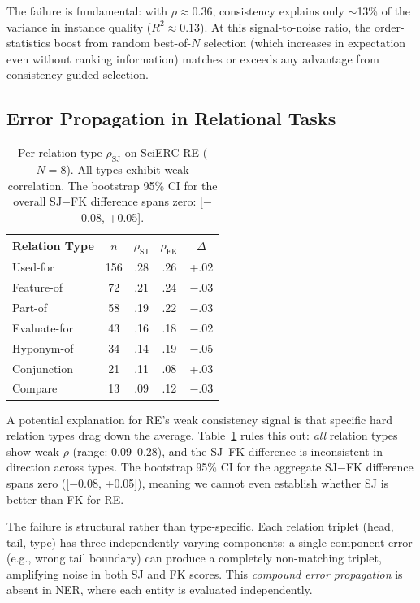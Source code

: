 \documentclass[11pt,a4paper]{article}
\begin{document}
The failure is fundamental: with $\rho \approx 0.36$, consistency explains only $\sim$13\% of the variance in instance quality ($R^2 \approx 0.13$).
At this signal-to-noise ratio, the order-statistics boost from random best-of-$N$ selection (which increases in expectation even without ranking information) matches or exceeds any advantage from consistency-guided selection.

\subsection{Error Propagation in Relational Tasks}

\begin{table}[t]
\centering
\small
\begin{tabular}{lcccc}
\toprule
\textbf{Relation Type} & $n$ & $\rho_{\text{SJ}}$ & $\rho_{\text{FK}}$ & $\Delta$ \\
\midrule
Used-for & 156 & .28 & .26 & +.02 \\
Feature-of & 72 & .21 & .24 & $-$.03 \\
Part-of & 58 & .19 & .22 & $-$.03 \\
Evaluate-for & 43 & .16 & .18 & $-$.02 \\
Hyponym-of & 34 & .14 & .19 & $-$.05 \\
Conjunction & 21 & .11 & .08 & +.03 \\
Compare & 13 & .09 & .12 & $-$.03 \\
\bottomrule
\end{tabular}
\caption{Per-relation-type $\rho_{\text{SJ}}$ on SciERC RE ($N{=}8$). All types exhibit weak correlation. The bootstrap 95\% CI for the overall SJ$-$FK difference spans zero: [$-$0.08, +0.05].}
\label{tab:pertype}
\end{table}

A potential explanation for RE's weak consistency signal is that specific hard relation types drag down the average.
Table~\ref{tab:pertype} rules this out: \emph{all} relation types show weak $\rho$ (range: 0.09--0.28), and the SJ--FK difference is inconsistent in direction across types.
The bootstrap 95\% CI for the aggregate SJ$-$FK difference spans zero ([$-$0.08, +0.05]), meaning we cannot even establish whether SJ is better than FK for RE.

The failure is structural rather than type-specific.
Each relation triplet (head, tail, type) has three independently varying components; a single component error (e.g., wrong tail boundary) can produce a completely non-matching triplet, amplifying noise in both SJ and FK scores.
This \emph{compound error propagation} is absent in NER, where each entity is evaluated independently.
\end{document}
